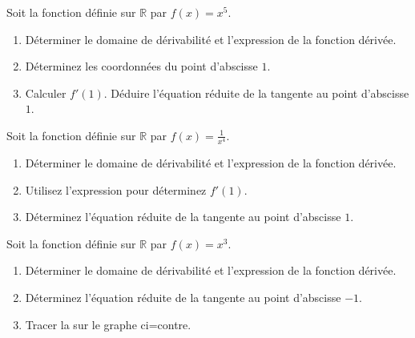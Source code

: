 \documentclass[main.tex]{subfiles}
\begin{document}
\parbox{0.76\linewidth}{
\begin{exercise} Soit la fonction définie sur $\mathbb{R}$ par $f(x)=x^5$. 
\begin{enumerate}[leftmargin=*,label=\arabic*)]
		\item Déterminer le domaine de dérivabilité et l'expression de la fonction dérivée.
		\item Déterminez les coordonnées du point d'abscisse $1$.
		\item Calculer $f'(1)$. Déduire l'équation réduite de la tangente au point d'abscisse $1$.
	\end{enumerate}
\end{exercise}
\begin{exercise} Soit la fonction définie sur $\mathbb{R}$ par $f(x)=\frac{1}{x^4}$. 
\begin{enumerate}[leftmargin=*,label=\arabic*)]
	\item Déterminer le domaine de dérivabilité et l'expression de la fonction dérivée.
	\item Utilisez l'expression pour déterminez $f'(1)$.
	\item Déterminez l'équation réduite de la tangente au point d'abscisse $1$.
\end{enumerate}
\end{exercise}
\begin{exercise} Soit la fonction définie sur $\mathbb{R}$ par $f(x)=x^3$. 
\begin{enumerate}[leftmargin=*,label=\arabic*)]
	\item Déterminer le domaine de dérivabilité et l'expression de la fonction dérivée.
	\item Déterminez l'équation réduite de la tangente au point d'abscisse $-1$. 
	\item Tracer la sur le graphe ci=contre.
\end{enumerate}
\end{exercise} 
}\hfill 
\end{document}
